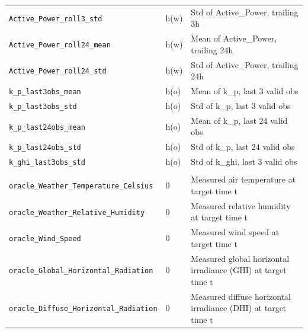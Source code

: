 \begin{table}[t]
\begin{tabular}{ll p{4.5cm}}
    \texttt{Active\_Power\_roll3\_std} & h(w) & Std of Active\_Power, trailing 3h \\
    \texttt{Active\_Power\_roll24\_mean} & h(w) & Mean of Active\_Power, trailing 24h \\
    \texttt{Active\_Power\_roll24\_std} & h(w) & Std of Active\_Power, trailing 24h \\
    \texttt{k\_p\_last3obs\_mean} & h(o) & Mean of k\_p, last 3 valid obs \\
    \texttt{k\_p\_last3obs\_std} & h(o) & Std of k\_p, last 3 valid obs \\
    \texttt{k\_p\_last24obs\_mean} & h(o) & Mean of k\_p, last 24 valid obs \\
    \texttt{k\_p\_last24obs\_std} & h(o) & Std of k\_p, last 24 valid obs \\
    \texttt{k\_ghi\_last3obs\_std} & h(o) & Std of k\_ghi, last 3 valid obs \\
    \addlinespace
    \multicolumn{3}{l}{\textit{oracle weather (5 features)}} \\
    \texttt{oracle\_Weather\_Temperature\_Celsius} & 0 & Measured air temperature at target time t \\
    \texttt{oracle\_Weather\_Relative\_Humidity} & 0 & Measured relative humidity at target time t \\
    \texttt{oracle\_Wind\_Speed} & 0 & Measured wind speed at target time t \\
    \texttt{oracle\_Global\_Horizontal\_Radiation} & 0 & Measured global horizontal irradiance (GHI) at target time t \\
    \texttt{oracle\_Diffuse\_Horizontal\_Radiation} & 0 & Measured diffuse horizontal irradiance (DHI) at target time t \\
    \bottomrule
  \end{tabular}
\end{table}
